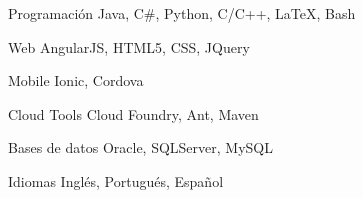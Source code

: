 

\begin{cvskills}

  \cvskill
    {Programación} %
    {Java, C\#, Python, C/C++, LaTeX, Bash} %

  \cvskill
    {Web} %
    {AngularJS, HTML5, CSS, JQuery} %

  \cvskill
    {Mobile} %
    {Ionic, Cordova} %
    
  \cvskill
    {Cloud Tools} %
    {Cloud Foundry, Ant, Maven} %

  \cvskill
    {Bases de datos} %
    {Oracle, SQLServer, MySQL} %
        
  \cvskill
    {Idiomas} %
    {Inglés, Portugués, Español} %
    

\end{cvskills}
